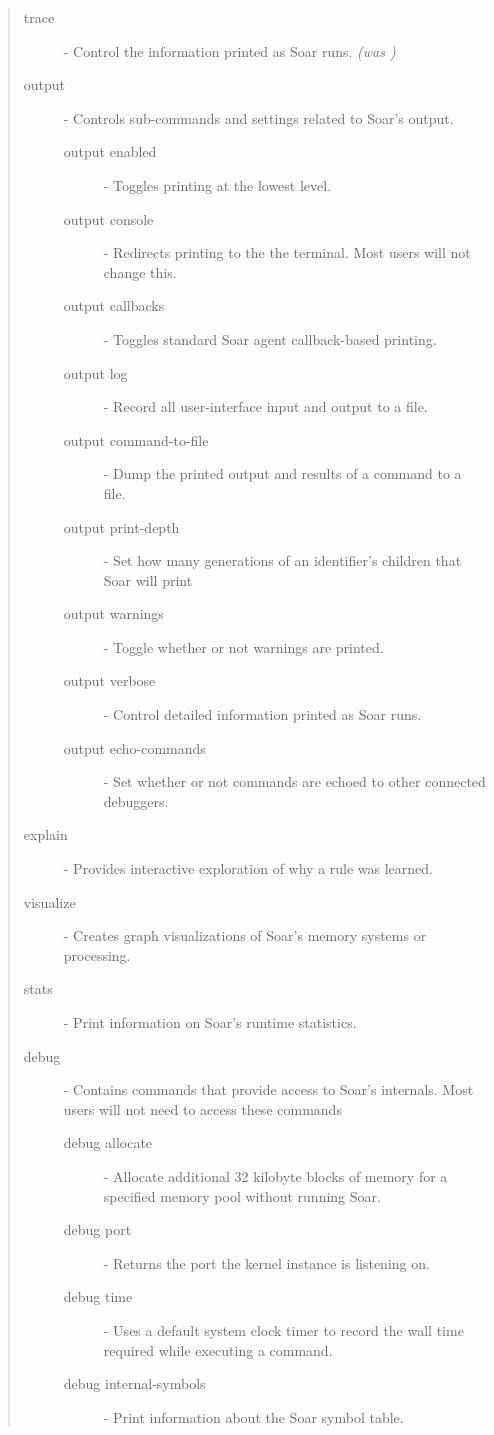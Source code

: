 \begin{quote}
	\begin{description}
	\item[trace] - Control the information printed as Soar runs. \emph{(was )}
	\item[output] - Controls sub-commands and settings related to Soar's output.
	\begin{description}
		\item[output enabled] - Toggles printing at the lowest level.
		\item[output console] - Redirects printing to the the terminal.  Most users will not change this.
		\item[output callbacks] - Toggles standard Soar agent callback-based printing.
		\item[output log] - Record all user-interface input and output to a file.
		\item[output command-to-file] - Dump the printed output and results of a command to a file.
		\item[output print-depth] - Set how many generations of an identifier's children that Soar will print
		\item[output warnings] - Toggle whether or not warnings are printed.
		\item[output verbose] - Control detailed information printed as Soar runs.
		\item[output echo-commands] - Set whether or not commands are echoed to other connected debuggers.
	\end{description}
	\item[explain] - Provides interactive exploration of why a rule was learned.
	\item[visualize] - Creates graph visualizations of Soar's memory systems or processing.
	\item[stats] - Print information on Soar's runtime statistics.
	\item[debug] - Contains commands that provide access to Soar's internals. Most users will not need to access these commands
	\begin{description}
		\item[debug allocate] - Allocate additional 32 kilobyte blocks of memory for a specified memory pool without running Soar.
		\item[debug port] - Returns the port the kernel instance is listening on.
		\item[debug time] - Uses a default system clock timer to record the wall time required while executing a command.
		\item[debug internal-symbols] - Print information about the Soar symbol table.
	\end{description}
	\end{description}
\end{quote}

